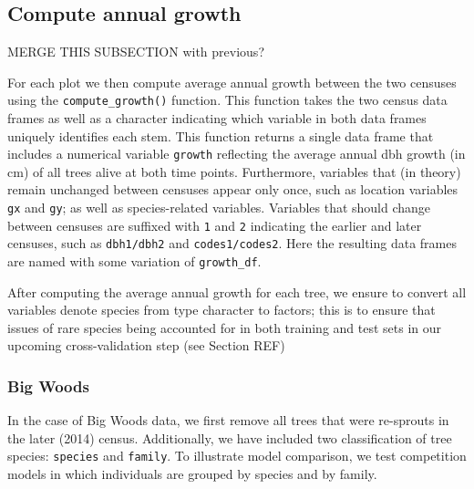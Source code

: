 \documentclass[12pt]{article}
\begin{document}
\hypertarget{compute-annual-growth}{%
\subsection{Compute annual growth}\label{compute-annual-growth}}

MERGE THIS SUBSECTION with previous?

For each plot we then compute average annual growth between the two
censuses using the \texttt{compute\_growth()} function. This function
takes the two census data frames as well as a character indicating which
variable in both data frames uniquely identifies each stem. This
function returns a single data frame that includes a numerical variable
\texttt{growth} reflecting the average annual dbh growth (in cm) of all
trees alive at both time points. Furthermore, variables that (in theory)
remain unchanged between censuses appear only once, such as location
variables \texttt{gx} and \texttt{gy}; as well as species-related
variables. Variables that should change between censuses are suffixed
with \texttt{1} and \texttt{2} indicating the earlier and later
censuses, such as \texttt{dbh1/dbh2} and \texttt{codes1/codes2}. Here
the resulting data frames are named with some variation of
\texttt{growth\_df}.

After computing the average annual growth for each tree, we ensure to
convert all variables denote species from type character to factors;
this is to ensure that issues of rare species being accounted for in
both training and test sets in our upcoming cross-validation step (see
Section REF)

\hypertarget{big-woods-1}{%
\subsubsection{Big Woods}\label{big-woods-1}}

In the case of Big Woods data, we first remove all trees that were
re-sprouts in the later (2014) census. Additionally, we have included
two classification of tree species: \texttt{species} and
\texttt{family}. To illustrate model comparison, we test competition
models in which individuals are grouped by species and by family.
\end{document}
